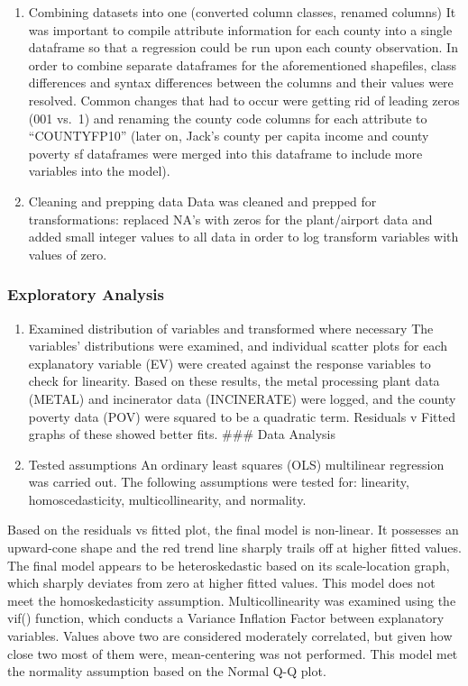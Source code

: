 \documentclass[
  12pt,
]{article}
\providecommand{\tightlist}{%
  \setlength{\itemsep}{0pt}\setlength{\parskip}{0pt}}
\begin{document}
\begin{enumerate}
\def\labelenumi{\arabic{enumi}.}
\setcounter{enumi}{1}
\item
  Combining datasets into one (converted column classes, renamed
  columns) It was important to compile attribute information for each
  county into a single dataframe so that a regression could be run upon
  each county observation. In order to combine separate dataframes for
  the aforementioned shapefiles, class differences and syntax
  differences between the columns and their values were resolved. Common
  changes that had to occur were getting rid of leading zeros (001
  vs.~1) and renaming the county code columns for each attribute to
  ``COUNTYFP10'' (later on, Jack's county per capita income and county
  poverty sf dataframes were merged into this dataframe to include more
  variables into the model).
\item
  Cleaning and prepping data Data was cleaned and prepped for
  transformations: replaced NA's with zeros for the plant/airport data
  and added small integer values to all data in order to log transform
  variables with values of zero.
\end{enumerate}

\hypertarget{exploratory-analysis-2}{%
\subsubsection{Exploratory Analysis}\label{exploratory-analysis-2}}

\begin{enumerate}
\def\labelenumi{\arabic{enumi}.}
\tightlist
\item
  Examined distribution of variables and transformed where necessary The
  variables' distributions were examined, and individual scatter plots
  for each explanatory variable (EV) were created against the response
  variables to check for linearity. Based on these results, the metal
  processing plant data (METAL) and incinerator data (INCINERATE) were
  logged, and the county poverty data (POV) were squared to be a
  quadratic term. Residuals v Fitted graphs of these showed better fits.
  \#\#\# Data Analysis
\item
  Tested assumptions An ordinary least squares (OLS) multilinear
  regression was carried out. The following assumptions were tested for:
  linearity, homoscedasticity, multicollinearity, and normality.
\end{enumerate}

Based on the residuals vs fitted plot, the final model is non-linear. It
possesses an upward-cone shape and the red trend line sharply trails off
at higher fitted values. The final model appears to be heteroskedastic
based on its scale-location graph, which sharply deviates from zero at
higher fitted values. This model does not meet the homoskedasticity
assumption. Multicollinearity was examined using the vif() function,
which conducts a Variance Inflation Factor between explanatory
variables. Values above two are considered moderately correlated, but
given how close two most of them were, mean-centering was not performed.
This model met the normality assumption based on the Normal Q-Q plot.
\newpage
\end{document}
